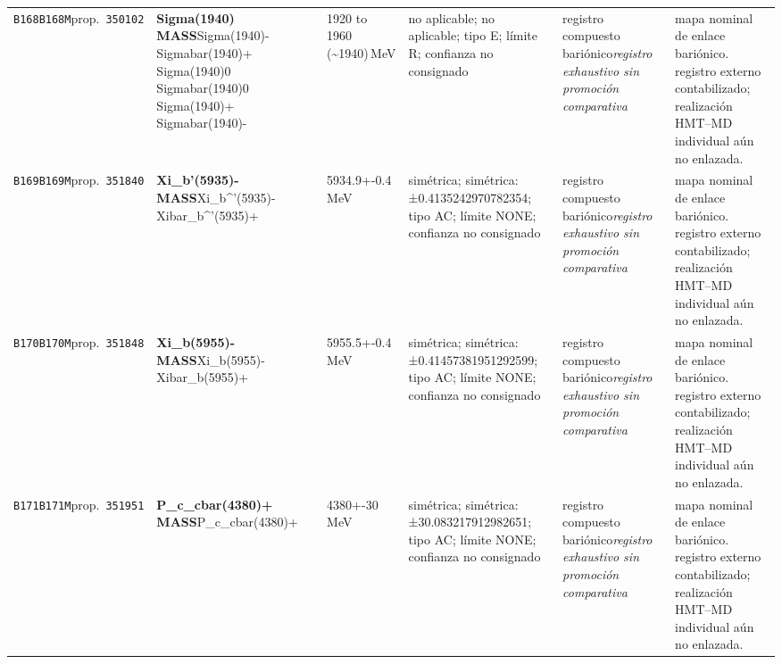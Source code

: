 \begin{landscape}
\begin{longtable}{L{1.85cm}L{4.45cm}L{2.35cm}L{4.05cm}L{3.35cm}L{7.15cm}}
\texttt{B168}\newline \texttt{B168M}\newline prop.\ \texttt{350102} & \textbf{Sigma(1940) MASS}\newline Sigma(1940)- \textbar{}\allowbreak{} Sigmabar(1940)+ \textbar{}\allowbreak{} Sigma(1940)0 \textbar{}\allowbreak{} Sigmabar(1940)0 \textbar{}\allowbreak{} Sigma(1940)+ \textbar{}\allowbreak{} Sigmabar(1940)- & 1920 to 1960 (\textasciitilde{}1940)\,MeV & no aplicable; no aplicable; tipo E; límite R; confianza no consignado & registro compuesto bariónico\newline \emph{registro exhaustivo sin promoción comparativa} & mapa nominal de enlace bariónico. registro externo contabilizado; realización HMT--MD individual aún no enlazada. \\
\texttt{B169}\newline \texttt{B169M}\newline prop.\ \texttt{351840} & \textbf{Xi\_\allowbreak{}b'(5935)- MASS}\newline Xi\_\allowbreak{}b\textasciicircum{}'(5935)- \textbar{}\allowbreak{} Xibar\_\allowbreak{}b\textasciicircum{}'(5935)+ & 5934.9+-0.4\,MeV & simétrica; simétrica: ±0.4135242970782354; tipo AC; límite NONE; confianza no consignado & registro compuesto bariónico\newline \emph{registro exhaustivo sin promoción comparativa} & mapa nominal de enlace bariónico. registro externo contabilizado; realización HMT--MD individual aún no enlazada. \\
\texttt{B170}\newline \texttt{B170M}\newline prop.\ \texttt{351848} & \textbf{Xi\_\allowbreak{}b(5955)- MASS}\newline Xi\_\allowbreak{}b(5955)- \textbar{}\allowbreak{} Xibar\_\allowbreak{}b(5955)+ & 5955.5+-0.4\,MeV & simétrica; simétrica: ±0.41457381951292599; tipo AC; límite NONE; confianza no consignado & registro compuesto bariónico\newline \emph{registro exhaustivo sin promoción comparativa} & mapa nominal de enlace bariónico. registro externo contabilizado; realización HMT--MD individual aún no enlazada. \\
\texttt{B171}\newline \texttt{B171M}\newline prop.\ \texttt{351951} & \textbf{P\_\allowbreak{}c\_\allowbreak{}cbar(4380)+ MASS}\newline P\_\allowbreak{}c\_\allowbreak{}cbar(4380)+ & 4380+-30\,MeV & simétrica; simétrica: ±30.083217912982651; tipo AC; límite NONE; confianza no consignado & registro compuesto bariónico\newline \emph{registro exhaustivo sin promoción comparativa} & mapa nominal de enlace bariónico. registro externo contabilizado; realización HMT--MD individual aún no enlazada. \\

\end{longtable}
\end{landscape}
